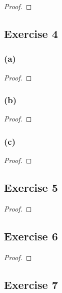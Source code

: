 \documentclass[14pt]{extarticle}
\begin{document}
\begin{proof}

\end{proof}

\subsection{Exercise 4}

\subsubsection{(a)}

\begin{proof}

\end{proof}

\subsubsection{(b)}

\begin{proof}

\end{proof}

\subsubsection{(c)}

\begin{proof}

\end{proof}

\subsection{Exercise 5}

\begin{proof}

\end{proof}

\subsection{Exercise 6}

\begin{proof}

\end{proof}

\subsection{Exercise 7}
\end{document}
